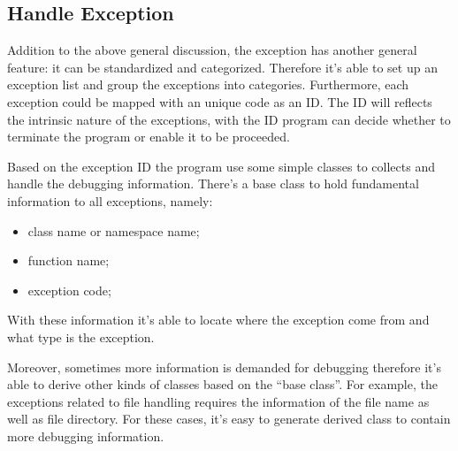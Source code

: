 \subsection{Handle Exception}
%
%
%
Addition to the above general discussion, the exception has another general feature: 
it can be standardized and categorized. Therefore it's able to set up an exception 
list and group the exceptions into categories. Furthermore, each exception could be 
mapped with an unique code as an ID. The ID will reflects the intrinsic nature of the 
exceptions, with the ID program can decide whether to terminate the program or enable 
it to be proceeded.

Based on the exception ID the program use some simple classes to collects and handle 
the debugging information. There's a base class to hold fundamental information to 
all exceptions, namely:
\begin{itemize}
 \item class name or namespace name;
 \item function name;
 \item exception code;
\end{itemize}
With these information it's able to locate where the exception come from and what type
is the exception.

Moreover, sometimes more information is demanded for debugging therefore it's able to 
derive other kinds of classes based on the ``base class''. For example, the exceptions
related to file handling requires the information of the file name as well as file 
directory. For these cases, it's easy to generate derived class to contain more 
debugging information.
